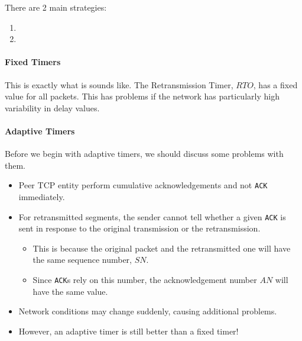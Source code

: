 There are 2 main strategies:
\begin{enumerate}[noitemsep]
\item {}
\item {}
\end{enumerate}

\paragraph{Fixed Timers}\label{par:Fixed_Packet_Timers}
This is exactly what is sounds like.
The Retransmission Timer, $RTO$, has a fixed value for all packets.
This has problems if the network has particularly high variability in delay values.

\paragraph{Adaptive Timers}\label{par:Adaptive_Packet_Timers}
Before we begin with adaptive timers, we should discuss some problems with them.
\begin{itemize}[noitemsep]
\item Peer TCP entity perform cumulative acknowledgements and not \texttt{ACK} immediately.
\item For retransmitted segments, the sender cannot tell whether a given \texttt{ACK} is sent in response to the original transmission or the retransmission.
  \begin{itemize}[noitemsep]
  \item This is because the original packet and the retransmitted one will have the same sequence number, $SN$.
  \item Since \texttt{ACK}s rely on this number, the acknowledgement number $AN$ will have the same value.
  \end{itemize}
\item Network conditions may change suddenly, causing additional problems.
\item However, an adaptive timer is still better than a fixed timer!
\end{itemize}

